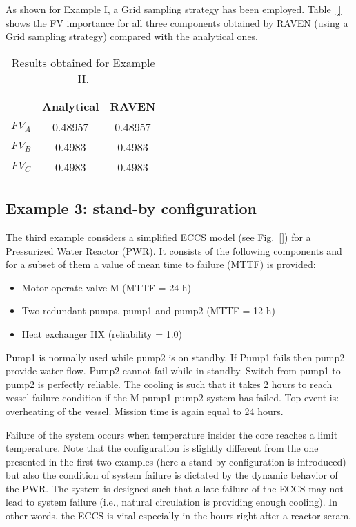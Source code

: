 As shown for Example I, a Grid sampling strategy has been employed. Table~\ref{} shows the 
FV importance for all three components obtained by RAVEN (using a Grid sampling strategy) 
compared with the analytical ones.

\begin{table}
  \caption{Results obtained for Example II.} 
  \centering 
  \begin{tabular}{c | c | c } 
    \hline 
     & Analytical & RAVEN \\ 
    \hline 
    $FV_A$ & 0.48957 & 0.48957  \\
    $FV_B$ & 0.4983  & 0.4983   \\
    $FV_C$ & 0.4983  & 0.4983   \\
    \hline 
  \end{tabular}
  \label{tab:example2} 
\end{table}

\subsection{Example 3: stand-by configuration}
\label{sec:example3}

The third example considers a simplified ECCS model (see Fig.~\ref{}) for a Pressurized 
Water Reactor (PWR). It consists of the following components and for a subset of them a 
value of mean time to failure (MTTF) is provided:
\begin{itemize}
  \item Motor-operate valve M (MTTF = 24 h)
  \item Two redundant pumps, pump1 and pump2 (MTTF = 12 h)
  \item Heat exchanger HX (reliability = 1.0)
\end{itemize}

Pump1 is normally used while pump2 is on standby. If Pump1 fails then pump2 provide water flow. 
Pump2 cannot fail while in standby. Switch from pump1 to pump2 is perfectly reliable. 
The cooling is such that it takes 2 hours to reach vessel failure condition if the M-pump1-pump2 
system has failed. Top event is: overheating of the vessel. Mission time is again equal to 24 hours.

Failure of the system occurs when temperature insider the core reaches a limit temperature. 
Note that the configuration is slightly different from the one presented in the first two 
examples (here a stand-by configuration is introduced) but also the condition of system failure 
is dictated by the dynamic behavior of the PWR.  The system is designed such that a late failure 
of the ECCS may not lead to system failure (i.e., natural circulation is providing enough cooling). 
In other words, the ECCS is vital especially in the hours right after a reactor scram.

